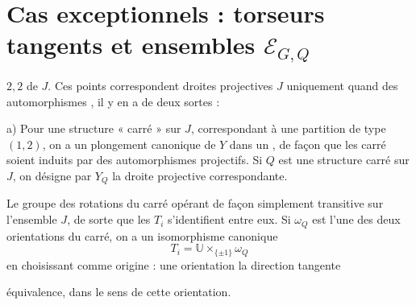 \documentclass[11pt,a4paper]{article}
\begin{document}
\section{Cas exceptionnels : torseurs tangents et ensembles $\mathcal{E}_{G,Q}$}


 $2,2$ de $J$. Ces points correspondent  droites projectives $J$ \ill{} uniquement quand \ill{} des automorphismes  , il y en a de deux sortes :


a) Pour une structure « carré » sur $J$, correspondant à une partition de type $(1,2)$, on a un plongement canonique de $Y$ dans un , de façon que les    carré soient induits par des automorphismes projectifs. Si $Q$ est une structure carré sur $J$, on désigne par $Y_Q$ la droite projective correspondante. \struck{\ill{}}


Le groupe des rotations du carré opérant de façon simplement transitive sur l'ensemble $J$, de sorte que les $T_i$ s'identifient entre eux. Si $\omega_Q$ est l'une des deux orientations du carré,  on a un isomorphisme canonique
\[
T_i = \mathbb{U} \times_{\{\pm1\}} \omega_Q
\]
en choisissant comme  origine \ill{} : une orientation \ill{} la direction tangente

\ill{} équivalence, dans le sens de cette orientation.
\end{document}
